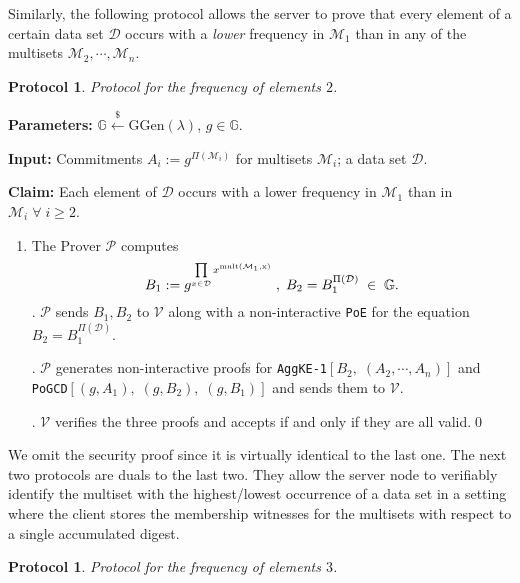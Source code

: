 \documentclass[11pt, lettersize, notitlepage, leqno, footskip=0.6cm]{article}
\newcommand{\pl}{\prod\limits}
\newcommand{\bG}{\mathbb{G}}
\newcommand{\mc}{\mathcal}
\newcommand{\mb}{\mathbb}
\newcommand{\mr}{\mathrm}
\newcommand{\lamb}{\lambda}
\newcommand{\mP}{\mc{P}}
\newcommand{\V}{\mc{V}}
\newcommand{\vs}{\vspace{-0.15cm}}
\newcommand{\noin}{\noindent}
\newtheorem{Prot}[Thm]{Protocol}
\numberwithin{equation}{section}
\begin{document}
\vspace{0.2cm}

Similarly, the following protocol allows the server to prove that every element of a certain data set $\mc{D}$ occurs with a \textit{lower} frequency in $\mc{M}_1$ than in any of the multisets $\mc{M}_2,\cdots,\mc{M}_n$.

\begin{Prot} Protocol for the frequency of elements $2$.\end{Prot} \vspace{-0.3cm}

\noin \textbf{Parameters:} $\mb{G}\xleftarrow{\$} \mr{GGen}(\lamb)$,\; $g\in \mb{G}$.

\noin \textbf{Input:} Commitments $A_i := g^{\Pi(\mc{M}_i)}$ for multisets $\mc{M}_i$; a data set $\mc{D}$.

\noin \textbf{Claim:} Each element of $\mc{D}$ occurs with a lower frequency in $\mc{M}_1$ than in $\mc{M}_i\;\forall\;i\geq 2$. \vs

\begin{enumerate}[wide, labelwidth=!, labelindent=0pt] \vs \item The Prover $\mP$ computes \vspace{-0.25cm} $$B_1:= g^{\pl_{x\in\mc{D}} x^{\mr{mult(\mc{M}_1, x)}}}\;,\; B_2 = B_1^{\Pi(\mc{D})}\;\in\;\bG. \vs $$
\noin 2. $\mP$ sends $B_1, B_2$ to $\V$ along with a non-interactive \verb|PoE| for the equation $B_2= B_1^{\Pi(\mc{D})}$. 

\noin 3. $\mP$ generates non-interactive proofs for \verb|AggKE-1|$[B_2,\;(A_2,\cdots,A_n)]$ and\\ \verb|PoGCD|$[(g, A_1),\;(g, B_2),\;(g,B_1)]$ and sends them to $\V$. 

\noin 4. $\V$ verifies the three proofs and accepts if and only if they are all valid.\qed\end{enumerate}

We omit the security proof since it is virtually identical to the last one. The next two protocols are duals to the last two. They allow the server node to verifiably identify the multiset with the highest/lowest occurrence of a data set in a setting where the client stores the membership witnesses for the multisets with respect to a single accumulated digest.

\begin{Prot} Protocol for the frequency of elements $3$.\end{Prot} \vspace{-0.3cm}
\end{document}

